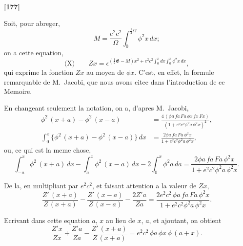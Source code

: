 \documentclass[11pt,a4paper]{article}
\begin{document}
\textbf{[177]}

Soit, pour abreger,
\begin{equation}
M = \frac{e^2 c^2}{\Omega} \int_0^{\frac{1}{2}\Omega} \phi^2 x\, dx; \tag{45}
\end{equation}
on a cette equation,
\begin{equation*}
\text{(X)}\qquad Zx = \epsilon^{(\frac{1}{2}\mathfrak{G} - M)x^2 + e^2 c^2 \int_0^x dx \int_0^x \phi^2 x\, dx},
\end{equation*}
qui exprime la fonction $Zx$ au moyen de $\phi x$. C'est, en effet, la formule remarquable
de M.~Jacobi, que nous avons citee dans l'introduction de ce Memoire.

En changeant seulement la notation, on a, d'apres M.~Jacobi,
\begin{align}
\phi^2\, (x+a) - \phi^2\, (x-a) &= \frac{4\, (\phi a\, fa\, Fa\, \phi x\, fx\, Fx)}{(1 + e^2 c^2 \phi^2 a\, \phi^2 x)^2}, \tag{46}\\
\int_0^x \{\phi^2\, (x+a) - \phi^2\, (x-a)\}\, dx &= \frac{2\phi a\, fa\, Fa\, \phi^2 x}{1 + e^2 c^2 \phi^2 a\, \phi^2 x}, \tag{47}
\end{align}
ou, ce qui est la meme chose,
\begin{equation}
\int_{-a}^{x} \phi^2\, (x+a)\, dx - \int_a^x \phi^2\, (x-a)\, dx - 2\int_0^x \phi^2 a\, da = \frac{2\phi a\, fa\, Fa\, \phi^2 x}{1 + e^2 c^2 \phi^2 a\, \phi^2 x}. \tag{48}
\end{equation}

De la, en multipliant par $e^2 c^2$, et faisant attention a la valeur de $Zx$,
\begin{equation}
\frac{Z'\, (x+a)}{Z\, (x+a)} - \frac{Z'\, (x-a)}{Z\, (x-a)} - \frac{2Z'a}{Za} = \frac{2e^2 c^2\, \phi a\, fa\, Fa\, \phi^2 x}{1 + e^2 c^2 \phi^2 a\, \phi^2 x}. \tag{49}
\end{equation}

Ecrivant dans cette equation $a$, $x$ au lieu de $x$, $a$, et ajoutant, on obtient
\begin{equation}
\frac{Z'x}{Zx} + \frac{Z'a}{Za} - \frac{Z'\, (x+a)}{Z\, (x+a)} = e^2 c^2\, \phi a\, \phi x\, \phi\, (a+x). \tag{50}
\end{equation}
\end{document}
